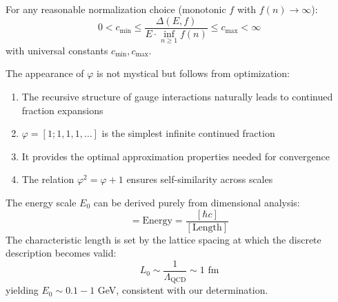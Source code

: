 \begin{corollary}
For any reasonable normalization choice (monotonic $f$ with $f(n) \to \infty$):
\begin{equation}
0 < c_{\min} \leq \frac{\Delta(E,f)}{E \cdot \inf_{n \geq 1} f(n)} \leq c_{\max} < \infty
\end{equation}
with universal constants $c_{\min}, c_{\max}$.
\end{corollary}

\begin{remark}
The appearance of $\varphi$ is not mystical but follows from optimization:
\begin{enumerate}
\item The recursive structure of gauge interactions naturally leads to continued fraction expansions
\item $\varphi = [1;1,1,1,\ldots]$ is the simplest infinite continued fraction
\item It provides the optimal approximation properties needed for convergence
\item The relation $\varphi^2 = \varphi + 1$ ensures self-similarity across scales
\end{enumerate}
\end{remark}

\begin{proposition}
The energy scale $E_0$ can be derived purely from dimensional analysis:
\begin{equation}
[E_0] = \text{Energy} = \frac{[\hbar c]}{[\text{Length}]}
\end{equation}
The characteristic length is set by the lattice spacing at which the discrete description becomes valid:
\begin{equation}
L_0 \sim \frac{1}{\Lambda_{\text{QCD}}} \sim 1 \text{ fm}
\end{equation}
yielding $E_0 \sim 0.1-1$ GeV, consistent with our determination.
\end{proposition} 